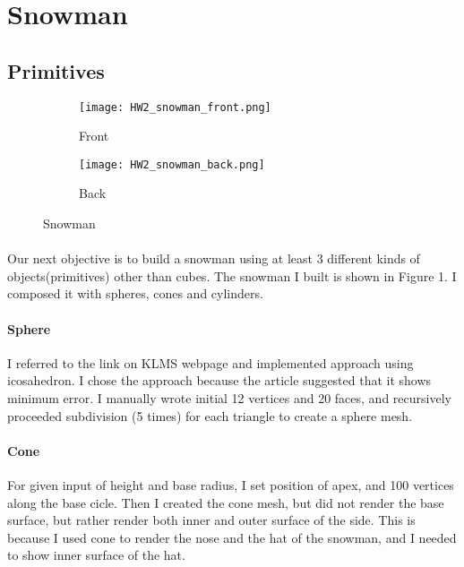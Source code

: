 \documentclass[10pt,a4paper]{article}
\begin{document}
	\section{Snowman}
	\subsection{Primitives}
	\begin{minipage}[h]{\linewidth}
		\begin{wrapfigure}{L}{0.4\linewidth}
			\begin{subfigure}{0.2\linewidth}
				\centering
				\texttt{[image: HW2\_snowman\_front.png]}
				\caption{Front}
				\label{fig:snowman-a}
			\end{subfigure}
			\begin{subfigure}{\linewidth}
				\centering
				\texttt{[image: HW2\_snowman\_back.png]}
				\caption{Back}
				\label{fig:snowman-b}
			\end{subfigure}
			\caption{Snowman}
			\label{fig:snowman}
		\end{wrapfigure}
		
		\paragraph{}
		Our next objective is to build a snowman using at least 3 different kinds of objects(primitives) other than cubes. The snowman I built is shown in Figure 1. I composed it with spheres, cones and cylinders.
		
		\paragraph{Sphere}
		I referred to the link on KLMS webpage \cite{spheremesh} and implemented approach using icosahedron. I chose the approach because the article suggested that it shows minimum error. I manually wrote initial 12 vertices and 20 faces, and recursively proceeded subdivision (5 times) for each triangle to create a sphere mesh.
	\end{minipage}
	
	\paragraph{Cone}
	For given input of height and base radius, I set position of apex, and 100 vertices along the base cicle. Then I created the cone mesh, but did not render the base surface, but rather render both inner and outer surface of the side. This is because I used cone to render the nose and the hat of the snowman, and I needed to show inner surface of the hat.
	
\end{document}
